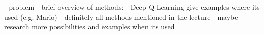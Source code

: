 - problem
- brief overview of methods:
- Deep Q Learning give examples where its used (e.g. Mario)
- definitely all methods mentioned in the lecture
- maybe research more possibilities and examples when its used